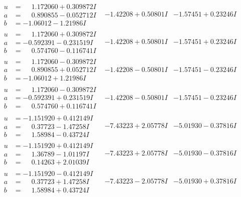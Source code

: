 \documentclass[1p]{elsarticle_modified}
\theoremstyle{definition}
\begin{document}
$$\begin{array}{c|c|c}
\begin{aligned}
u &= \phantom{-}1.172060 + 0.309872 I \\
a &= \phantom{-}0.890855 - 0.052712 I \\
b &= -1.06012 - 1.21986 I\end{aligned}
 & -1.42208 + 0.50801 I & -1.57451 + 0.23246 I \\ \hline\begin{aligned}
u &= \phantom{-}1.172060 + 0.309872 I \\
a &= -0.592391 - 0.231519 I \\
b &= \phantom{-}0.574760 - 0.116741 I\end{aligned}
 & -1.42208 + 0.50801 I & -1.57451 + 0.23246 I \\ \hline\begin{aligned}
u &= \phantom{-}1.172060 - 0.309872 I \\
a &= \phantom{-}0.890855 + 0.052712 I \\
b &= -1.06012 + 1.21986 I\end{aligned}
 & -1.42208 - 0.50801 I & -1.57451 - 0.23246 I \\ \hline\begin{aligned}
u &= \phantom{-}1.172060 - 0.309872 I \\
a &= -0.592391 + 0.231519 I \\
b &= \phantom{-}0.574760 + 0.116741 I\end{aligned}
 & -1.42208 - 0.50801 I & -1.57451 - 0.23246 I \\ \hline\begin{aligned}
u &= -1.151920 + 0.412149 I \\
a &= \phantom{-}0.37723 - 1.47258 I \\
b &= \phantom{-}1.58984 - 0.43724 I\end{aligned}
 & -7.43223 + 2.05778 I & -5.01930 - 0.37816 I \\ \hline\begin{aligned}
u &= -1.151920 + 0.412149 I \\
a &= \phantom{-}1.36789 - 1.01197 I \\
b &= \phantom{-}0.14263 + 2.01039 I\end{aligned}
 & -7.43223 + 2.05778 I & -5.01930 - 0.37816 I \\ \hline\begin{aligned}
u &= -1.151920 - 0.412149 I \\
a &= \phantom{-}0.37723 + 1.47258 I \\
b &= \phantom{-}1.58984 + 0.43724 I\end{aligned}
 & -7.43223 - 2.05778 I & -5.01930 + 0.37816 I \\ \hline\begin{aligned}

\end{aligned}
\end{array}$$
\end{document}
